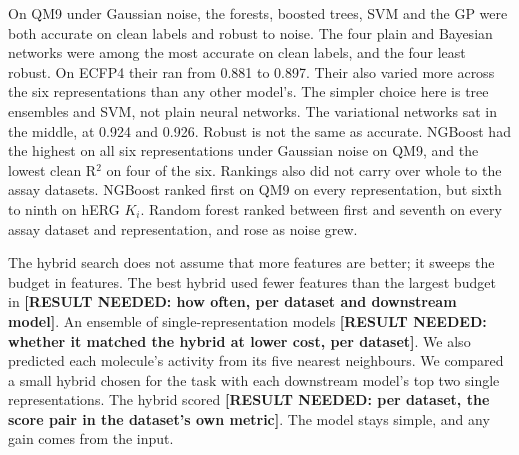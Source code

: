 On QM9 under Gaussian noise, the forests, boosted trees, SVM and the GP were both accurate on clean labels and robust to noise. The four plain and Bayesian networks were among the most accurate on clean labels, and the four least robust. On ECFP4 their \aucnorm{} ran from 0.881 to 0.897. Their \aucnorm{} also varied more across the six representations than any other model's. The simpler choice here is tree ensembles and SVM, not plain neural networks. The variational networks sat in the middle, at \aucnorm{} 0.924 and 0.926. Robust is not the same as accurate. NGBoost had the highest \aucnorm{} on all six representations under Gaussian noise on QM9, and the lowest clean R$^2$ on four of the six. Rankings also did not carry over whole to the assay datasets. NGBoost ranked first on QM9 on every representation, but sixth to ninth on hERG $K_i$. Random forest ranked between first and seventh on every assay dataset and representation, and rose as noise grew.

The hybrid search does not assume that more features are better; it sweeps the budget in features. The best hybrid used fewer features than the largest budget in \textbf{[RESULT NEEDED: how often, per dataset and downstream model]}. An ensemble of single-representation models \textbf{[RESULT NEEDED: whether it matched the hybrid at lower cost, per dataset]}. We also predicted each molecule's activity from its five nearest neighbours. We compared a small hybrid chosen for the task with each downstream model's top two single representations. The hybrid scored \textbf{[RESULT NEEDED: per dataset, the score pair in the dataset's own metric]}. The model stays simple, and any gain comes from the input.

